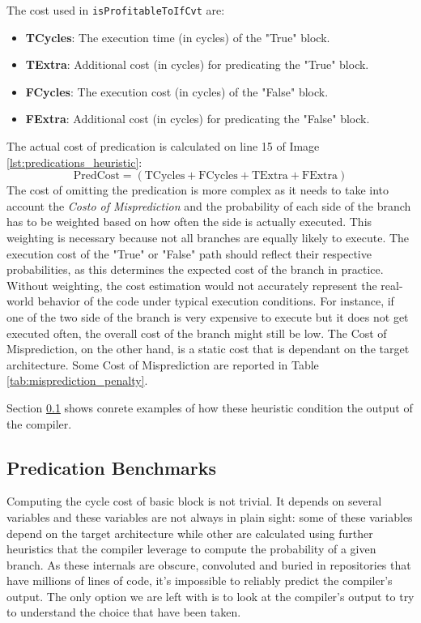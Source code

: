 The cost used in \texttt{isProfitableToIfCvt} are:

\begin{itemize}
    \item \textbf{TCycles}: The execution time (in cycles) of the "True" block.
    \item \textbf{TExtra}: Additional cost (in cycles) for predicating the "True" block.
    \item \textbf{FCycles}: The execution cost (in cycles) of the "False" block.
    \item \textbf{FExtra}: Additional cost (in cycles) for predicating the "False" block.
\end{itemize}

The actual cost of predication is calculated on line 15 of Image \ref{lst:predications_heuristic}:
\[
\text{PredCost} = (\text{TCycles} + \text{FCycles} + \text{TExtra} + \text{FExtra})
\]
The cost of omitting the predication is more complex as it needs to take into account the \textit{Costo of Misprediction} and the probability of each side of the branch has to be weighted based on how often the side is actually executed.
This weighting is necessary because not all branches are equally likely to execute. The execution cost of the "True" or "False" path should reflect their respective probabilities, as this determines the expected cost of the branch in practice. Without weighting, the cost estimation would not accurately represent the real-world behavior of the code under typical execution conditions. For instance, if one of the two side of the branch is very expensive to execute but it does not get executed often, the overall cost of the branch might still be low.
The {Cost of Misprediction}, on the other hand, is a static cost that is dependant on the target architecture. Some {Cost of Misprediction} are reported in Table \ref{tab:misprediction_penalty}.

Section \ref{sec:predication_benchmark} shows conrete examples of how these heuristic condition the output of the compiler.

\subsection{Predication Benchmarks}
\label{sec:predication_benchmark}

Computing the cycle cost of basic block is not trivial. It depends on several variables and these variables are not always in plain sight: some of these variables depend on the target architecture while other are calculated using further heuristics that the compiler leverage to compute the probability of a given branch. As these internals are obscure, convoluted and buried in repositories that have millions of lines of code, it's impossible to reliably predict the compiler's output. The only option we are left with is to look at the compiler's output to try to understand the choice that have been taken.

